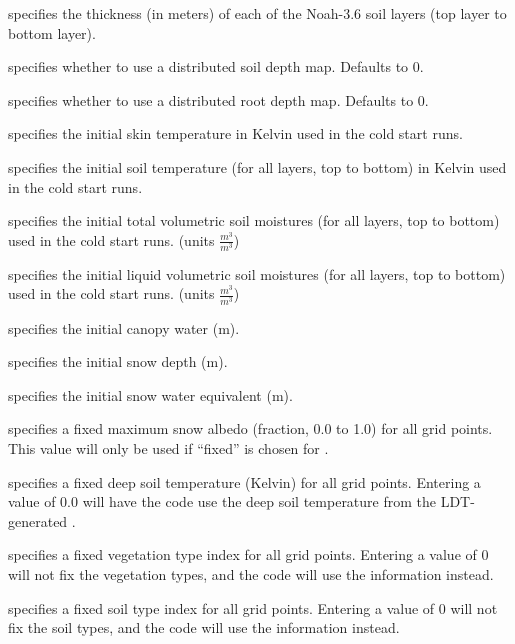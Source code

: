   specifies the thickness (in meters)
 of each of the Noah-3.6 soil layers (top layer to bottom layer).

  specifies whether
 to use a distributed soil depth map. Defaults to 0.

  specifies whether
 to use a distributed root depth map. Defaults to 0.

 specifies the initial skin temperature in Kelvin used in the
 cold start runs.

 specifies the initial soil temperature (for all layers,
 top to bottom) in Kelvin used in the cold start runs.

  specifies the
 initial total volumetric soil moistures (for all layers,
 top to bottom) used in the cold start runs.
 (units $\frac{m^3}{m^3}$)

  specifies the
 initial liquid volumetric soil moistures (for all layers,
 top to bottom) used in the cold start runs.
 (units $\frac{m^3}{m^3}$)

  specifies the initial
 canopy water (m).

  specifies the initial
 snow depth (m).

  specifies the initial
 snow water equivalent (m).

  specifies a fixed maximum
 snow albedo (fraction, 0.0 to 1.0) for all grid points.  This
 value will only be used if ``fixed'' is chosen for
 .

  specifies a fixed
 deep soil temperature (Kelvin) for all grid points.  Entering
 a value of 0.0 will have the code use the deep soil temperature
 from the LDT-generated .

  specifies a fixed
 vegetation type index for all grid points.  Entering a value
 of 0 will not fix the vegetation types, and the code will use
 the  information instead.

  specifies a fixed soil
 type index for all grid points.  Entering a value of 0
 will not fix the soil types, and the code will use the
  information instead.

